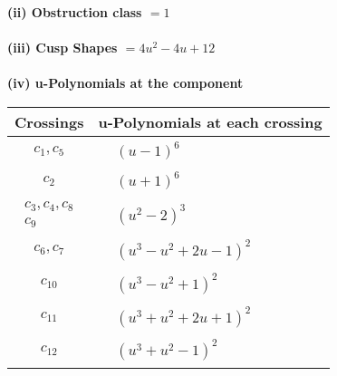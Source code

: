 \documentclass[1p]{elsarticle_modified}
\theoremstyle{definition}
\begin{document}
\flushleft \textbf{(ii) Obstruction class $= 1$}\\~\\
\flushleft \textbf{(iii) Cusp Shapes $= 4 u^2-4 u+12$}\\~\\
\newpage\renewcommand{\arraystretch}{1}
\flushleft \textbf{(iv) u-Polynomials at the component}\newline \\
\begin{tabular}{m{50pt}|m{274pt}}
Crossings & \hspace{64pt}u-Polynomials at each crossing \\
\hline $$\begin{aligned}c_{1},c_{5}\end{aligned}$$&$\begin{aligned}
&(u-1)^6
\end{aligned}$\\
\hline $$\begin{aligned}c_{2}\end{aligned}$$&$\begin{aligned}
&(u+1)^6
\end{aligned}$\\
\hline $$\begin{aligned}c_{3},c_{4},c_{8}\\c_{9}\end{aligned}$$&$\begin{aligned}
&(u^2-2)^3
\end{aligned}$\\
\hline $$\begin{aligned}c_{6},c_{7}\end{aligned}$$&$\begin{aligned}
&(u^3- u^2+2 u-1)^2
\end{aligned}$\\
\hline $$\begin{aligned}c_{10}\end{aligned}$$&$\begin{aligned}
&(u^3- u^2+1)^2
\end{aligned}$\\
\hline $$\begin{aligned}c_{11}\end{aligned}$$&$\begin{aligned}
&(u^3+u^2+2 u+1)^2
\end{aligned}$\\
\hline $$\begin{aligned}c_{12}\end{aligned}$$&$\begin{aligned}
&(u^3+u^2-1)^2
\end{aligned}$\\
\hline
\end{tabular}\\~\\
\end{document}
